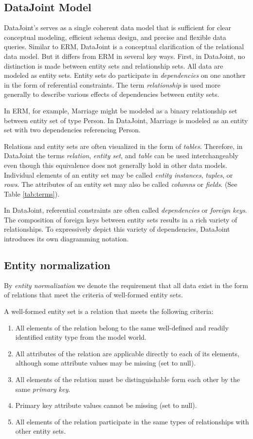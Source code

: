 \documentclass[letter,10pt]{article}
\newcommand{\datajoint}{DataJoint\xspace}
\begin{document}
\subsection{DataJoint Model}
\datajoint's serves as a single coherent data model that is sufficient for clear conceptual modeling, efficient schema design, and precise and flexible data queries. 
Similar to ERM, \datajoint is a conceptual clarification of the relational data model.  
But it differs from ERM in several key ways. 
First, in \datajoint, no distinction is made between entity sets and relationship sets.  All data are modeled as entity sets.
Entity sets do participate in \emph{dependencies} on one another in the form of referential constraints.  The term \emph{relationship} is used more generally to describe various  effects of dependencies between entity sets.

In ERM, for example, Marriage might be modeled as a binary relationship set between entity set of type Person.  In \datajoint, Marriage is modeled as an entity set with two dependencies referencing Person. 

Relations and entity sets are often visualized in the form of \emph{tables}. 
Therefore, in \datajoint the terms \emph{relation}, \emph{entity set}, and \emph{table} can be used interchangeably even though this equivalence does not generally hold in other data models. 
Individual elements of an entity set may be called \emph{entity instances}, \emph{tuples}, or \emph{rows}.
The attributes of an entity set may also be called \emph{columns} or \emph{fields}. (See Table \ref{tab:terms}).

In \datajoint, referential constraints are often called \emph{dependencies} or \emph{foreign keys}.  
The composition of foreign keys between entity sets results in a rich variety of relationships. 
To expressively depict this variety of dependencies, \datajoint introduces its own diagramming notation.


\subsection{Entity normalization}\label{sec:norm}
By \emph{entity normalization} we denote the requirement that all data exist in the form of relations that meet the criteria of well-formed entity sets.

A well-formed entity set is a relation that meets the following criteria:
\begin{enumerate}
\item All elements of the relation belong to the same well-defined and readily identified entity type from the model world.
\item All attributes of the relation are applicable directly to each of its elements, although some attribute values may be missing (set to null).  
\item All elements of the relation must be distinguishable form each other by the same \emph{primary key}.
\item Primary key attribute values cannot be missing (set to null).
\item All elements of the relation participate in the same types of relationships with other entity sets.
\end{enumerate}
\end{document}
